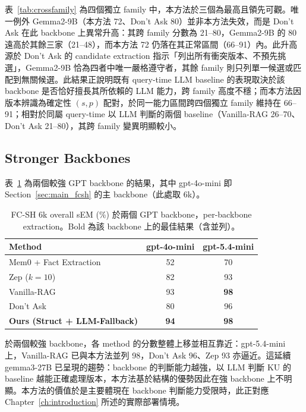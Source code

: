 表~\ref{tab:crossfamily} 為四個獨立 family 中，本方法於三個為最高且領先可觀。唯一例外 Gemma2-9B（本方法 72、Don't Ask 80）並非本方法失效，而是 Don't Ask 在此 backbone 上異常升高：其跨 family 分數為 21--80，Gemma2-9B 的 80 遠高於其餘三家（21--48），而本方法 72 仍落在其正常區間（66--91）內。此升高源於 Don't Ask 的 candidate extraction 指示「列出所有衝突版本、不預先挑選」，Gemma2-9B 恰為四者中唯一嚴格遵守者，其餘 family 則只列單一候選或匹配到無關候選。此結果正說明既有 query-time LLM baseline 的表現取決於該 backbone 是否恰好擅長其所依賴的 LLM 能力，跨 family 高度不穩；而本方法因版本辨識為確定性 $(s, p)$ 配對，於同一能力區間跨四個獨立 family 維持在 66--91；相對於同屬 query-time 以 LLM 判斷的兩個 baseline（Vanilla-RAG 26--70、Don't Ask 21--80），其跨 family 變異明顯較小。
 
\subsection{Stronger Backbones}
\label{subsec:strongbackbone}
 
表~\ref{tab:strongbackbone} 為兩個較強 GPT backbone 的結果，其中 gpt-4o-mini 即 Section~\ref{sec:main_fcsh} 的主 backbone（此處取 6k）。
 
\begin{table}[!htb]
\centering
\caption{FC-SH 6k overall sEM (\%) 於兩個 GPT backbone，per-backbone extraction。Bold 為該 backbone 上的最佳結果（含並列）。}
\label{tab:strongbackbone}
\small
\begin{tabular}{lcc}
\toprule
Method & gpt-4o-mini & gpt-5.4-mini \\
\midrule
Mem0 + Fact Extraction & 52 & 70 \\
Zep ($k=10$) & 82 & 93 \\
Vanilla-RAG & 93 & \textbf{98} \\
Don't Ask & 80 & 96 \\
\textbf{Ours (Struct + LLM-Fallback)} & \textbf{94} & \textbf{98} \\
\bottomrule
\end{tabular}
\end{table}
 
於兩個較強 backbone，各 method 的分數整體上移並相互靠近：gpt-5.4-mini 上，Vanilla-RAG 已與本方法並列 98，Don't Ask 96、Zep 93 亦逼近。這延續 gemma3-27B 已呈現的趨勢：backbone 的判斷能力越強，以 LLM 判斷 KU 的 baseline 越能正確處理版本，本方法基於結構的優勢因此在強 backbone 上不明顯。本方法的價值於是主要體現在 backbone 判斷能力受限時，此正對應 Chapter~\ref{ch:introduction} 所述的實際部署情境。
 
